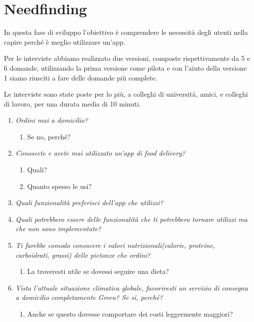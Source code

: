 \documentclass{article}
\begin{document}
\section{Needfinding} 
In questa fase di sviluppo l’obiettivo è comprendere le necessità degli utenti nella capire perché è meglio utilizzare un'app.
    \vspace{1cm}
     \par
\par Per le interviste abbiamo realizzato due versioni, composte rispettivamente da 5 e 6 domande, utilizzando la prima versione come pilota e con l'aiuto della versione 1 siamo riusciti a fare delle domande più complete. \par Le interviste sono state poste per lo più, a colleghi di università, amici, e colleghi di lavoro, per una durata media di 10 minuti.\par
  \vspace{1cm}\par
    \begin{enumerate}
    
     \item \textit{Ordini mai a domicilio?}
        \begin{enumerate}
            \item Se no, perché?
        \end{enumerate}
     \item \textit{Conoscete e avete mai utilizzato un'app di food delivery?}
     \begin{enumerate}
         \item Quali?
         \item Quanto spesso le usi?
     \end{enumerate}
     \item \textit{Quali funzionalità preferisci dell'app che utilizzi?}
     \item \textit{Quali potrebbero essere delle funzionalità che ti potrebbero tornare utilizzi ma che non sono implementate?}
    \item \textit{Ti farebbe comodo conoscere i valori nutrizionali(calorie, proteine, carboidrati, grassi) delle pietanze che ordini?}
    \begin{enumerate}
        \item La troveresti utile se dovessi seguire una dieta?
    \end{enumerate}
    \item \textit{Vista l'attuale situazione climatica globale, favoriresti un servizio di consegna a domicilio completamente Green? Se si, perché? }
    \begin{enumerate}
        \item Anche se questo dovesse comportare dei costi leggermente maggiori?
    \end{enumerate}
\end{enumerate}
\end{document}
